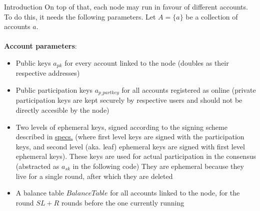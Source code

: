 \documentclass[10pt,a4paper]{article}
\begin{document}
\begin{section}{Introduction}
On top of that, each node may run in favour of different accounts. To do this,
it needs the following parameters. 
Let $A=\{a\}$ be a collection of accounts $a$.\\ \\
\noindent \textbf{Account parameters}:
\begin{itemize}
    \item Public keys $a_{pk}$ for every account linked to the node (doubles as their respective addresses)
    \item Public participation keys $a_{p\_partkey}$ for all accounts registered as online (private participation keys are kept
    securely by respective users and should not be directly accesible by the node)
    \item Two levels of ephemeral keys, signed according to the signing scheme described in \href{https://github.com/algorandfoundation/specs}{specs.} (where 
    first level keys are signed with the participation keys, and second level (aka. leaf) ephemeral keys are signed with 
    first level ephemeral keys). 
    These keys are used for actual participation in the consensus (abstracted as $a_{sk}$ in the following code)
    They are ephemeral because they live for a single round, after which they are deleted
    \item A balance table $BalanceTable$ for all accounts linked to the node, for the round $SL + R$ rounds before the one 
    currently running
\end{itemize}

\end{section}
\end{document}
